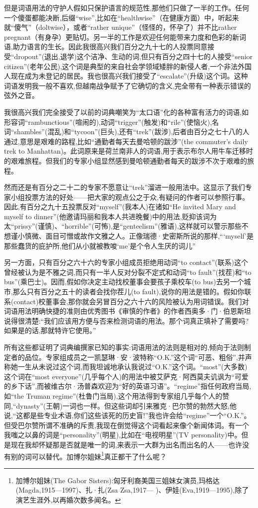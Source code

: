 但是词语用法的守护人假如只保护语言的规范性,那他们只做了一半的工作。任何一个傻蛋都能决断,后缀“wise”,比如在“healthwise”（在健康方面）中，听起来就“傻气”（doltwise），或者“rather unique”（怪怪的，怀孕了）并不比rather pregnant（有身孕）更贴切。另一半的工作是欢迎任何能带来力度和色彩的新词语,助力语言的生长。因此我很高兴我们百分之九十七的人投票同意接受“dropout”(退出,退学)这个洁净、生动的词,但只有百分之四十七的人接受“senior citizen”(老年公民),这个词是典型的来自社会学领域矮胖的新侵人者,一个非法外国人现在成为未登记的居民。我也很高兴我们接受了“escalate”(升级)这个词。这种词语发明我一般不喜欢,但越南战争赋予了它确切的含义,完全带有一种表示错误的弦外之音。

我很高兴我们完全接受了以前的词典嘲笑为“太口语”化的各种富有活力的词语,如形容词“rambunctious”(喧闹的),动词“trigger”(触发)和“rile”(使恼火),名词“shambles”(混乱)和“tycoon”(巨头),还有“trek”(跋涉),后者由百分之七十八的人通过,意思是艰难的路程,比如“通勤者每天去曼哈顿的跋涉”(the commuter’s daily trek to Manhattan)。此词原来是荷兰南非人的词语,用于表示布尔人用牛车迁移时的艰难旅程。但我们的专家小组显然感到曼哈顿通勤者每天的跋涉不次于艰难的旅程。

然而还是有百分之二十二的专家不愿意让“trek”溜进一般用法中。这显示了我们专家小组投票方法的好处——把大家的观点公之于众,有疑问的作者可以参照行事。因此,有百分之九十五投票反对“myself”(我本人)在诸如“He invited Mary and myself to dinner”(他邀请玛丽和我本人共进晚餐)中的用法,贬抑该词为太“prissy”(谨慎)、“horrible”(可怖),是“genteelism”(雅语),这样就可以警示那些不想谨小慎微、面目可憎或故作文雅之人。正像瑞德·史密斯所说的那样,“‘myself’是那些蠢货的庇护所,他们从小就被教唆‘me’是个令人生厌的词儿”


另一方面，只有百分之六十六的专家小组成员拒绝用动词“to contact”(联系)这个曾经被认为是不雅之词,而只有一半人反对分裂不定式和动词“to fault”(找茬)和“to bus”(乘巴士)。因而,假如你决定主动找校董事会要孩子乘校车(to bus)去另一个城市,那么只有百分之五十的读者会找你茬儿(to fault),说你的用法是错的。假如你联系(contact)校董事会,那你就会另冒百分之六十六的风险被认为用词错误。我们对词语用法明确快捷的准则由优秀图书《审慎的作者》的作者西奥多·门·伯恩斯坦说得很清楚:“我们应该用方便与否来检测词语的用法。那个词真正填补了需要吗?如果是的话,那就特许它使用。”

所有这些都证明了词典编撰家已知的事实:词语用法的法则是相对的,倾向于法则制定者的品位。专家组成员之一凯瑟琳·安·波特称“O.K.”这个词“可恶、粗俗”,并声称她一生从未说过这个词,而我坦诚地承认我说过“O.K.”这个词。“most”(大多数)这个词在“most everyone”(几乎每个人)的用法中被艾萨克·阿西莫夫讥讽为“可爱的乡下话”,而被维古尔·汤普森欢迎为“好的英语习语”。“regime”指任何政府当局,如“the Truman regime”(杜鲁门当局),这个用法得到专家组几乎每个人的赞同,“dynasty”(王朝)一词也一样。但这些词却引来雅克·巴尔赞的勃然大怒,他说,“这都是些专业术语,你们这些该死的历史盲!”我也许会给“regime”一个“O.K.”。但受巴尔赞所谓不准确的斥责,我现在倒觉得这个词看起来像个新闻体词。有一个我嗤之以鼻的词是“personality”(明星),比如在“电视明星”(TV personality)中。但是现在我却怀疑那是否就是唯一的词,来表示一大群为出名而出名的人——也许没有别的词可以替代。加博尔姐妹\footnote{加博尔姐妹(The Gabor Sisters):匈牙利裔美国三姐妹女演员,玛格达(Magda,1915—1997)、扎·扎(Zsa Zsa,1917— )、伊娃(Eva,1919—1995),除了演艺生涯外,以再婚次数多闻名。}真正都干了什么呢？


